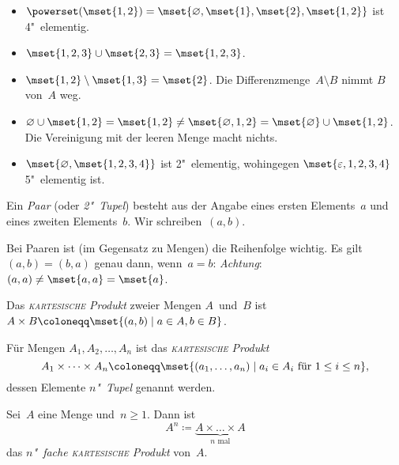 \documentclass[a4paper]{article}
\begin{document}
\begin{example}\leavevmode
    \begin{itemize}
        \item $\powerset(\mset{1, 2}) = \mset{\varnothing, \mset{1}, \mset{2}, \mset{1, 2}}$ ist 4"~elementig.
        \item $\mset{1, 2, 3} \cup \mset{2, 3} = \mset{1, 2, 3}$.
        \item $\mset{1, 2} \setminus \mset{1, 3} = \mset{2}$. Die Differenzmenge~$A \setminus B$ nimmt $B$ von~$A$ weg.
        \item $\varnothing \cup \mset{1, 2} = \mset{1, 2} \neq \mset{\varnothing, 1, 2} = \mset{\varnothing} \cup \mset{1, 2}$. Die Vereinigung mit der leeren Menge macht nichts.
        \item $\mset{\varnothing, \mset{1, 2, 3, 4}}$ ist 2"~elementig, wohingegen $\mset{\varepsilon, 1, 2, 3, 4}$ 5"~elementig ist.
    \end{itemize}
\end{example}

\begin{definition}[Paar]
    Ein \emph{Paar} (oder \emph{2"~Tupel}) besteht aus der Angabe eines ersten Elements~$a$ und eines zweiten Elements~$b$. Wir schreiben~$(a, b)$.
\end{definition}

\begin{remark}
    Bei Paaren ist (im Gegensatz zu Mengen) die Reihenfolge wichtig. Es gilt $(a, b) = (b, a)$ genau dann, wenn~$a = b$: \emph{Achtung}: $(a, a) \neq \mset{a, a} = \mset{a}$.
\end{remark}

\begin{definition}
    Das \emph{\textsc{kartesische} Produkt} zweier Mengen $A$~und~$B$ ist $A \times B \coloneqq \mset{(a, b) \mid a \in A, b \in B}$.

    Für Mengen $A_1, A_2, \dots, A_n$ ist das \emph{\textsc{kartesische} Produkt}
    \begin{equation*}
        A_1 \times \dots \times A_n \coloneqq \mset{(a_1, \dots, a_n) \mid a_i \in A_i \text{ für } 1 \leq i \leq n},
    \end{equation*}
    dessen Elemente \emph{$n$"~Tupel} genannt werden.

    Sei~$A$ eine Menge und~$n \geq 1$. Dann ist
    \begin{equation*}
        A^n \coloneqq \underbrace{A \times \dots \times A}_{n \text{ mal}}
    \end{equation*}
    das \emph{$n$"~fache \textsc{kartesische} Produkt} von~$A$.
\end{definition}
\end{document}
